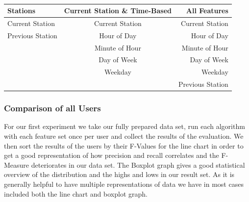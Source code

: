 \mbox{}\\
\begin{tabular}{l | c | r}
	\hline
	\textbf{Stations} & \textbf{Current Station \& Time-Based} & \textbf{All Features} \\
	\hline
	 Current Station  & Current Station & Current Station \\
	 Previous Station & Hour of Day & Hour of Day \\
	  & Minute of Hour & Minute of Hour \\
	  & Day of Week & Day of Week \\
	  & Weekday & Weekday \\
	  & & Previous Station \\
	  \hline
\end{tabular}



\newpage
\subsubsection{Comparison of all Users}
For our first experiment we take our fully prepared data set, run each algorithm with each feature set once per user and collect the results of the evaluation. We then sort the results of the users by their F-Values for the line chart in order to get a good representation of how precision and recall correlates and the F-Measure deteriorates in our data set. The Boxplot graph gives a good statistical overview of the distribution and the highs and lows in our result set. As it is generally helpful to have multiple representations of data we have in most cases included both the line chart and boxplot graph.


